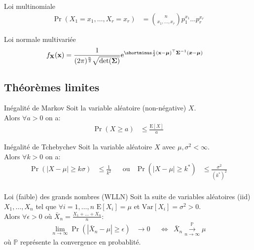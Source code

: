 \documentclass[10pt, french]{article}
\begin{document}
\begin{multicols*}{2}
\begin{rappel}{Loi multinomiale}
\begin{align*}
	\Pr(X_{1} = x_{1}, \dots, X_{r} = x_{r})
		&=	\binom{n}{x_{1}, \dots, x_{r}} p_{1}^{x_{1}} \dots p_{r}^{x_{r}}
\end{align*}
\end{rappel}

\begin{rappel}{Loi normale multivariée}
\begin{align*}
	f_{\matr{X}}(\matr{x}) 
		&= 	\frac{1}{(2 \pi)^{\frac{n}{2}} \sqrt{\text{det}(\bm{\Sigma})}} \e{\shortminus \frac{1}{2} (\matr{x} - \bm{\mu})^{\top} \bm{\Sigma}^{-1}(\bm{x} - \bm{\mu})}
\end{align*}
\end{rappel}

\columnbreak

\subsection*{Théorèmes limites}

\begin{algo}{Inégalité de Markov}
Soit la variable aléatoire (non-négative) $X$.\\
Alors $\forall a > 0$ on a:
\begin{align*}
	\Pr(X \ge a) 
	&\le 	\frac{\text{E}[X]}{a}
\end{align*}
\end{algo}

\begin{algo}{Inégalité de Tchebychev}
Soit la variable aléatoire $X$ avec $\mu, \sigma^{2} < \infty$.\\
Alors $\forall k > 0$ on a:
\begin{align*}
	\Pr\left( \left|X - \mu\right| \ge k \sigma\right)
	&\le 	\frac{1}{k^{2}}	&
	&\text{ou}	&
	\Pr\left( \left|X - \mu\right| \ge k^{*}\right)
	&\le 	\frac{\sigma^{2}}{(k^{*})^{2}}	\\
\end{align*}
\end{algo}

\begin{algo}{Loi (faible) des grands nombres (WLLN)}
Soit la suite de variables aléatoires (iid) $X_{1}, \dots, X_{n}$ tel que $\forall i = 1, \dots, n$ $\text{E}[X_{i}] = \mu$ et $\text{Var}[X_{i}] = \sigma^{2} > 0$.\\
Alors $\forall\epsilon > 0$ où $\bar{X}_{n} = \frac{X_{1} + \dots + X_{n}}{n}$:
\begin{align*} 
	\underset{n \rightarrow \infty}{\lim} \Pr\left( \left| \bar{X}_{n} -\mu \right| \ge \epsilon \right) 
	&\rightarrow		0	&
	&\Leftrightarrow	&
	\bar{X}_{n} \overset{\mathds{P}}{\underset{n \rightarrow \infty}{\longrightarrow}} \mu
\end{align*}
où $\mathds{P}$ représente la convergence en probablité.
\end{algo}


\end{multicols*}
\end{document}

